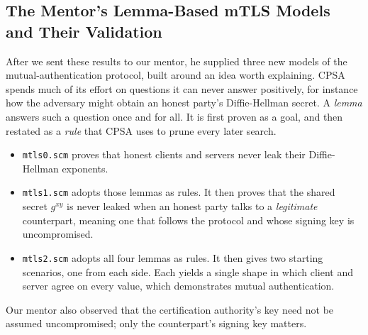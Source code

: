 \documentclass[11pt]{article}
\begin{document}
\subsection{The Mentor's Lemma-Based mTLS Models and Their Validation}
\label{subsec:lemmas}
After we sent these results to our mentor, he supplied three new models of the mutual-authentication protocol, built around an idea worth explaining. CPSA spends much of its effort on questions it can never answer positively, for instance how the adversary might obtain an honest party's Diffie-Hellman secret. A \textit{lemma} answers such a question once and for all. It is first proven as a goal, and then restated as a \textit{rule} that CPSA uses to prune every later search.

\begin{itemize}
    \item \texttt{mtls0.scm} proves that honest clients and servers never leak their Diffie-Hellman exponents.
    \item \texttt{mtls1.scm} adopts those lemmas as rules. It then proves that the shared secret $g^{xy}$ is never leaked when an honest party talks to a \textit{legitimate} counterpart, meaning one that follows the protocol and whose signing key is uncompromised.
    \item \texttt{mtls2.scm} adopts all four lemmas as rules. It then gives two starting scenarios, one from each side. Each yields a single shape in which client and server agree on every value, which demonstrates mutual authentication.
\end{itemize}
Our mentor also observed that the certification authority's key need not be assumed uncompromised; only the counterpart's signing key matters.
\end{document}
